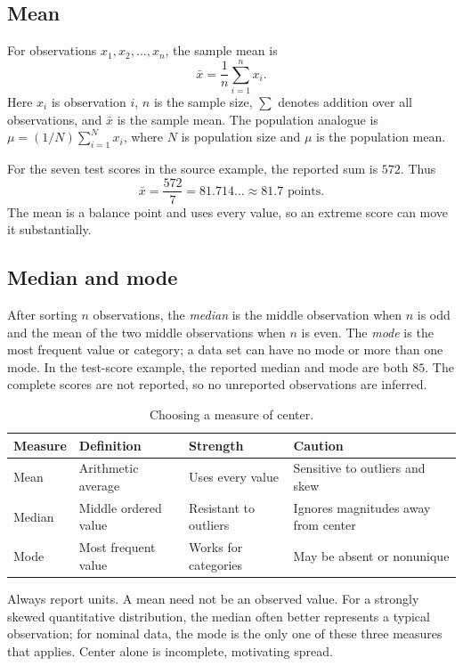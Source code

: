 \documentclass[11pt]{article}
\begin{document}
\subsection{Mean}
For observations $x_1,x_2,\ldots,x_n$, the sample mean is
\begin{equation}\label{eq:mean}
 \bar{x}=\frac{1}{n}\sum_{i=1}^{n}x_i.
\end{equation}
Here $x_i$ is observation $i$, $n$ is the sample size, $\sum$ denotes
addition over all observations, and $\bar{x}$ is the sample mean.  The
population analogue is $\mu=(1/N)\sum_{i=1}^{N}x_i$, where $N$ is population
size and $\mu$ is the population mean.

For the seven test scores in the source example, the reported sum is $572$.
Thus
\[
 \bar{x}=\frac{572}{7}=81.714\ldots\approx81.7\text{ points}.
\]
The mean is a balance point and uses every value, so an extreme score can
move it substantially.

\subsection{Median and mode}
After sorting $n$ observations, the \emph{median} is the middle observation
when $n$ is odd and the mean of the two middle observations when $n$ is even.
The \emph{mode} is the most frequent value or category; a data set can have
no mode or more than one mode.  In the test-score example, the reported
median and mode are both $85$.  The complete scores are not reported, so no
unreported observations are inferred.

\begin{table}[ht]
\centering
\caption{Choosing a measure of center.}\label{tab:center}
\begin{tabularx}{\textwidth}{@{}lYYY@{}}
\toprule
Measure & Definition & Strength & Caution \\
\midrule
Mean & Arithmetic average & Uses every value & Sensitive to outliers and skew \\
Median & Middle ordered value & Resistant to outliers & Ignores magnitudes away from center \\
Mode & Most frequent value & Works for categories & May be absent or nonunique \\
\bottomrule
\end{tabularx}
\end{table}

\begin{keybox}
Always report units.  A mean need not be an observed value.  For a strongly
skewed quantitative distribution, the median often better represents a
typical observation; for nominal data, the mode is the only one of these
three measures that applies.  Center alone is incomplete, motivating spread.
\end{keybox}
\end{document}
